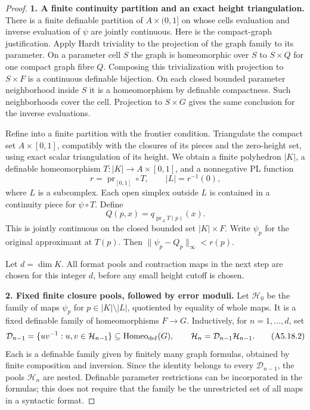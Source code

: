 \begin{proof}
\textbf{1. A finite continuity partition and an exact height triangulation.}\quad
There is a finite definable partition of $A\times(0,1]$ on whose cells
evaluation and inverse evaluation of $\psi$ are jointly continuous.
Here is the compact-graph justification. Apply Hardt triviality to the
projection of the graph family to its parameter. On a parameter cell $S$
the graph is homeomorphic over $S$ to $S\times Q$ for one compact graph
fibre $Q$. Composing this trivialization with projection to $S\times F$
is a continuous definable bijection. On each closed bounded parameter
neighborhood inside $S$ it is a homeomorphism by definable compactness.
Such neighborhoods cover the cell. Projection to $S\times G$ gives
the same conclusion for the inverse evaluations.

Refine into a finite partition with the frontier condition. Triangulate
the compact set $A\times[0,1]$, compatibly with the closures of its pieces
and the zero-height set, using exact scalar triangulation of its height.
We obtain a finite polyhedron $|K|$, a definable homeomorphism
$T:|K|\to A\times[0,1]$, and a nonnegative PL function
\[
 r=\operatorname{pr}_{[0,1]}\circ T,
 \qquad |L|=r^{-1}(0),
\]
where $L$ is a subcomplex. Each open simplex outside $L$ is contained in
a continuity piece for $\psi\circ T$. Define
\[
 Q(p,x)=q_{\operatorname{pr}_A T(p)}(x).
\]
This is jointly continuous on the closed bounded set $|K|\times F$.
Write $\psi_p$ for the original approximant at $T(p)$. Then
$\|\psi_p-Q_p\|_\infty<r(p)$.

Let $d=\dim K$. All format pools and contraction maps in the next step
are chosen for this integer $d$, before any small height cutoff is chosen.

\textbf{2. Fixed finite closure pools, followed by error moduli.}\quad
Let $\mathcal H_0$ be the family of maps $\psi_p$ for $p\in|K|\setminus|L|$,
quotiented by equality of whole maps. It is a fixed definable family of
homeomorphisms $F\to G$. Inductively, for $n=1,\ldots,d$, set
\[
 \mathcal D_{n-1}
   =\{uv^{-1}:u,v\in\mathcal H_{n-1}\}\subseteq\operatorname{Homeo}_{\rm def}(G),
 \qquad
 \mathcal H_n=\mathcal D_{n-1}\mathcal H_{n-1}.
 \tag{A5.18.2}
\]
Each is a definable family given by finitely many graph formulas, obtained
by finite composition and inversion. Since the identity belongs to every
$\mathcal D_{n-1}$, the pools $\mathcal H_n$ are nested. Definable parameter
restrictions can be incorporated in the formulas; this does not require
that the family be the unrestricted set of all maps in a syntactic format.


\end{proof}
